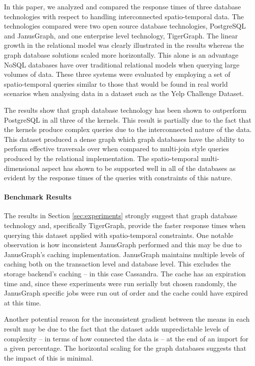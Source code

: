In this paper, we analyzed and compared the response times of three database technologies with respect to handling interconnected spatio-temporal data. The technologies compared were two open source database technologies, PostgreSQL and JanusGraph, and one enterprise level technology, TigerGraph. The linear growth in the relational model was clearly illustrated in the results whereas the graph database solutions scaled more horizontally. This alone is an advantage NoSQL databases have over traditional relational models when querying large volumes of data. These three systems were evaluated by employing a set of spatio-temporal queries similar to those that would be found in real world scenarios when analysing data in a dataset such as the Yelp Challenge Dataset. 

The results show that graph database technology has been shown to outperform PostgreSQL in all three of the kernels. This result is partially due to the fact that the kernels produce complex queries due to the interconnected nature of the data. This dataset produced a dense graph which graph databases have the ability to perform effective traversals over when compared to multi-join style queries produced by the relational implementation. The spatio-temporal multi-dimensional aspect has shown to be supported well in all of the databases as evident by the response times of the queries with constraints of this nature.

\paragraph{Benchmark Results}

The results in Section \ref{sec:experiments} strongly suggest that graph database technology and, specifically TigerGraph, provide the faster response times when querying this dataset applied with spatio-temporal constraints. One notable observation is how inconsistent JanusGraph performed and this may be due to JanusGraph's caching implementation. JanusGraph maintains multiple levels of caching both on the transaction level and database level. This excludes the storage backend's caching -- in this case Cassandra. The cache has an expiration time and, since these experiments were run serially but chosen randomly, the JanusGraph specific jobs were run out of order and the cache could have expired at this time.

Another potential reason for the inconsistent gradient between the means in each result may be due to the fact that the dataset adds unpredictable levels of complexity -- in terms of how connected the data is -- at the end of an import for a given percentage. The horizontal scaling for the graph databases suggests that the impact of this is minimal.

